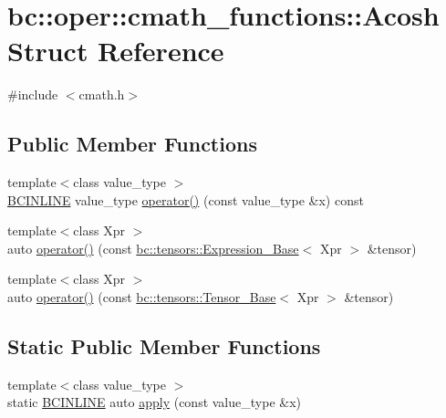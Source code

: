 \hypertarget{structbc_1_1oper_1_1cmath__functions_1_1Acosh}{}\section{bc\+:\+:oper\+:\+:cmath\+\_\+functions\+:\+:Acosh Struct Reference}
\label{structbc_1_1oper_1_1cmath__functions_1_1Acosh}


{\ttfamily \#include $<$cmath.\+h$>$}

\subsection*{Public Member Functions}
\begin{DoxyCompactItemize}
\item 
{\footnotesize template$<$class value\+\_\+type $>$ }\\\hyperlink{common_8h_a6699e8b0449da5c0fafb878e59c1d4b1}{B\+C\+I\+N\+L\+I\+NE} value\+\_\+type \hyperlink{structbc_1_1oper_1_1cmath__functions_1_1Acosh_a9dbd67feb47d89029340f4eb6040afdd}{operator()} (const value\+\_\+type \&x) const
\item 
{\footnotesize template$<$class Xpr $>$ }\\auto \hyperlink{structbc_1_1oper_1_1cmath__functions_1_1Acosh_a39b03c26fbdae12f411e9b4cc728259b}{operator()} (const \hyperlink{classbc_1_1tensors_1_1Expression__Base}{bc\+::tensors\+::\+Expression\+\_\+\+Base}$<$ Xpr $>$ \&tensor)
\item 
{\footnotesize template$<$class Xpr $>$ }\\auto \hyperlink{structbc_1_1oper_1_1cmath__functions_1_1Acosh_a4ee5951226fa7602ca79562912f34490}{operator()} (const \hyperlink{classbc_1_1tensors_1_1Tensor__Base}{bc\+::tensors\+::\+Tensor\+\_\+\+Base}$<$ Xpr $>$ \&tensor)
\end{DoxyCompactItemize}
\subsection*{Static Public Member Functions}
\begin{DoxyCompactItemize}
\item 
{\footnotesize template$<$class value\+\_\+type $>$ }\\static \hyperlink{common_8h_a6699e8b0449da5c0fafb878e59c1d4b1}{B\+C\+I\+N\+L\+I\+NE} auto \hyperlink{structbc_1_1oper_1_1cmath__functions_1_1Acosh_ab9fe3a2b62df67f130567a19b54934ca}{apply} (const value\+\_\+type \&x)
\end{DoxyCompactItemize}


